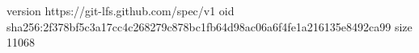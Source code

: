 version https://git-lfs.github.com/spec/v1
oid sha256:2f378bf5c3a17cc4c268279c878bc1fb64d98ac06a6f4fe1a216135e8492ca99
size 11068
